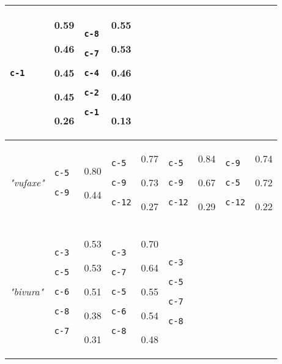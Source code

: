 {\begin{tabular}{@{}p{1.2cm}|p{1.3cm}@{}p{0.8cm}@{}|p{1.3cm}@{}p{0.8cm}@{}|p{1.3cm}@{}p{0.8cm}@{}|p{1.3cm}@{}p{0.8cm}@{}}
\texttt{c-1} & 0.59

0.46

0.45

0.45

0.26 & \texttt{c-8}

\texttt{c-7}

\texttt{c-4}

\texttt{c-2}

\texttt{c-1} & 0.55

0.53

0.46

0.40

0.13\\
\hline
\textit{"vufaxe"} & \texttt{c-5}

\texttt{c-9} & 0.80

0.44 & \texttt{c-5}

\texttt{c-9}

\texttt{c-12} & 0.77

0.73

0.27 & \texttt{c-5}

\texttt{c-9}

\texttt{c-12} & 0.84

0.67

0.29 & \texttt{c-9}

\texttt{c-5}

\texttt{c-12} & 0.74

0.72

0.22\\
\hline
\textit{"bivura"} & \texttt{c-3}

\texttt{c-5}

\texttt{c-6}

\texttt{c-8}

\texttt{c-7} & 0.53

0.53

0.51

0.38

0.31 & \texttt{c-3}

\texttt{c-7}

\texttt{c-5}

\texttt{c-6}

\texttt{c-8} & 0.70

0.64

0.55

0.54

0.48 & \texttt{c-3}

\texttt{c-5}

\texttt{c-7}

\texttt{c-8}


\end{tabular}}

